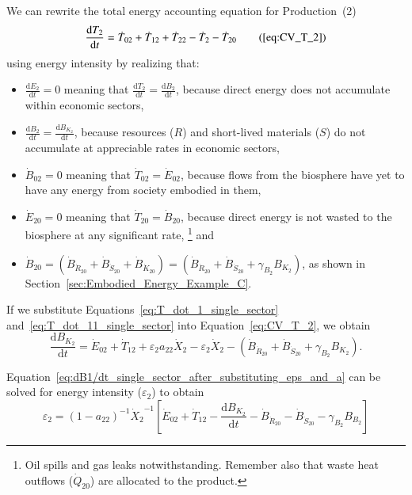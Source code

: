 We can rewrite the total energy accounting equation 
for Production~(2)
%
\begin{equation}
	\frac{\mathrm{d}T_{2}}{\mathrm{d}t} 	 
	= \dot{T}_{02} 
	+ \dot{T}_{12}
	+ \dot{T}_{22} 
	- \dot{T}_{2} 
	- \dot{T}_{20} \tag{\ref{eq:CV_T_2}}
\end{equation}
%
using energy intensity by realizing that:
%
\begin{itemize}
	\item{$\frac{\mathrm{d}E_2}{\mathrm{d}t} = 0$
		meaning that
		$\frac{\mathrm{d}T_2}{\mathrm{d}t} = \frac{\mathrm{d}B_2}{\mathrm{d}t}$, 
		because direct energy
		does not accumulate within economic sectors,}
	\item{$\frac{\mathrm{d}B_2}{\mathrm{d}t} = \frac{\mathrm{d}B_{K_{2}}}{\mathrm{d}t}$,
		because resources ($R$) and short-lived materials ($S$) do not 
		accumulate at appreciable rates in economic sectors,}
	\item{$\dot{B}_{02} = 0$ meaning that $\dot{T}_{02} = \dot{E}_{02}$,
		because flows from the biosphere have yet to have any energy from society embodied in them,}
	\item{$\dot{E}_{20} = 0$ meaning that $\dot{T}_{20} = \dot{B}_{20}$, 
		because direct energy is not wasted to the biosphere at any significant rate,%
			\footnote{Oil spills and gas leaks notwithstanding. 
			Remember also that waste heat outflows ($\dot{Q}_{20}$)
			are allocated to the product.
			} 
		and} 
	\item{$\dot{B}_{20} = \left( \dot{B}_{\dot{R}_{20}} 
							+ \dot{B}_{\dot{S}_{20}}
							+ \dot{B}_{\dot{K}_{20}}
							\right)
						= \left( \dot{B}_{\dot{R}_{20}} 
							+ \dot{B}_{\dot{S}_{20}}
							+ \gamma_{B_{2}} B_{K_{2}}
							\right)$, as shown in Section~\ref{sec:Embodied_Energy_Example_C}.}
\end{itemize}
%
If we substitute Equations~\ref{eq:T_dot_1_single_sector} 
and~\ref{eq:T_dot_11_single_sector} into Equation~\ref{eq:CV_T_2}, we obtain
%
\begin{equation} \label{eq:dB1/dt_single_sector_after_substituting_eps_and_a}
	\frac{\mathrm{d}B_{K_{2}}}{\mathrm{d}t} 
	= \dot{E}_{02} 
	+ \dot{T}_{12}
	+ \varepsilon_{2}a_{22}\dot{X}_{2} 
	- \varepsilon_{2}\dot{X}_{2} 
	- \left( \dot{B}_{\dot{R}_{20}} 
							+ \dot{B}_{\dot{S}_{20}}
							+ \gamma_{B_{2}} B_{K_{2}}
							\right).
\end{equation}

Equation~\ref{eq:dB1/dt_single_sector_after_substituting_eps_and_a}
can be solved for energy intensity ($\varepsilon_{2}$) to obtain
%
\begin{equation} \label{eq:B-epsilon}
	\varepsilon_{2}
	= {(1 - a_{22})}^{-1} {\dot{X}_{2}}^{-1} 
		\left[
			\dot{E}_{02}
			+ \dot{T}_{12}
			- \frac{\mathrm{d}B_{K_{2}}}{\mathrm{d}t} 
			- \dot{B}_{\dot{R}_{20}}
			- \dot{B}_{\dot{S}_{20}}
			- \gamma_{B_{2}} B_{B_{2}}
		\right]
\end{equation}

